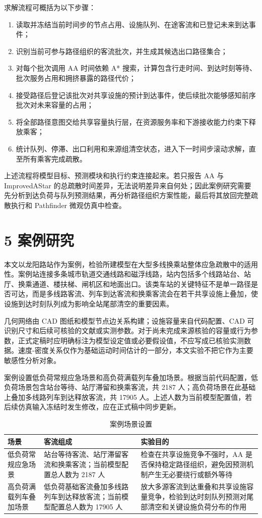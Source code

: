 \documentclass[UTF8,a4paper,12pt]{ctexart}
\begin{document}
求解流程可概括为以下步骤：
\begin{enumerate}
\item 读取并冻结当前时间步的节点占用、设施队列、在途客流和已登记未来到达事件；
\item 识别当前可参与路径组织的客流批次，并生成其候选出口路径集合；
\item 对每个批次调用 AA 时间依赖 A* 搜索，计算包含行走时间、到达时刻等待、批次服务占用和拥挤暴露的路径代价；
\item 接受路径后登记该批次对共享设施的预计到达事件，使后续批次能够感知前序批次对未来容量的占用；
\item 将全部路径意图交给共享容量执行层，在资源服务率和下游接收能力约束下释放乘客；
\item 统计队列、停滞、出口利用和来源组清空状态，进入下一时间步滚动求解，直至所有乘客完成疏散。
\end{enumerate}

上述流程将模型目标、预测模块和执行约束连接起来。若只报告 AA 与 ImprovedAStar 的总疏散时间差异，无法说明差异来自何处；因此案例研究需要先分析到达负荷与队列预测结果，再分析路径组织方案性能，最后将其放回完整疏散执行和 Pathfinder 微观仿真中检查。

\section{5 案例研究}

本文以龙阳路站作为案例，检验所建模型在大型多线换乘站整体应急疏散中的适用性。案例站连接多条城市轨道交通线路和磁浮线路，站内包括多个线路站台、站厅、换乘通道、楼扶梯、闸机区和地面出口。该类车站的关键特征不是单一路径是否可达，而是多线路客流、列车到达客流和换乘客流会在若干共享设施上叠加，使设施到达时刻队列成为影响全站尾部清空的重要因素。

几何网络由 CAD 图纸和模型节点边关系构建；设施容量来自代码配置、CAD 可识别尺寸和后续可核验的文献或实测参数。对于尚未完成来源核验的容量或行为参数，正式定稿时应明确标注为模型设定值或必要假设值，不应写成已核验实测数据。速度-密度关系仅作为基础运动时间估计的一部分，本文实验不把它作为主要敏感性分析对象。

案例设置低负荷常规应急场景和高负荷满载列车叠加场景。根据当前代码配置，低负荷场景包含站台等待、站厅滞留和换乘客流，共 2187 人；高负荷场景在此基础上叠加多线路列车到达释放客流，共 17905 人。上述人数为当前模型配置值，若后续仿真输入冻结时发生修改，应在正式稿中同步更新。

\begin{table}[htbp]
\centering
\caption{案例场景设置}
\small
\begin{tabular}{p{}p{}p{}}
\toprule
场景 & 客流组成 & 实验目的 \\
\midrule
低负荷常规应急场景 & 站台等待客流、站厅滞留客流和换乘客流；当前模型配置总人数为 2187 人 & 检查在共享设施竞争不强时，AA 是否保持稳定路径组织，避免因预测机制产生无必要绕行或额外等待 \\
高负荷满载列车叠加场景 & 低负荷基础客流叠加多线路列车到达释放客流；当前模型配置总人数为 17905 人 & 放大多源客流到达重叠和共享设施容量竞争，检验到达时刻队列预测对尾部清空和关键设施负荷分布的作用 \\
\bottomrule
\end{tabular}
\end{table}
\end{document}
